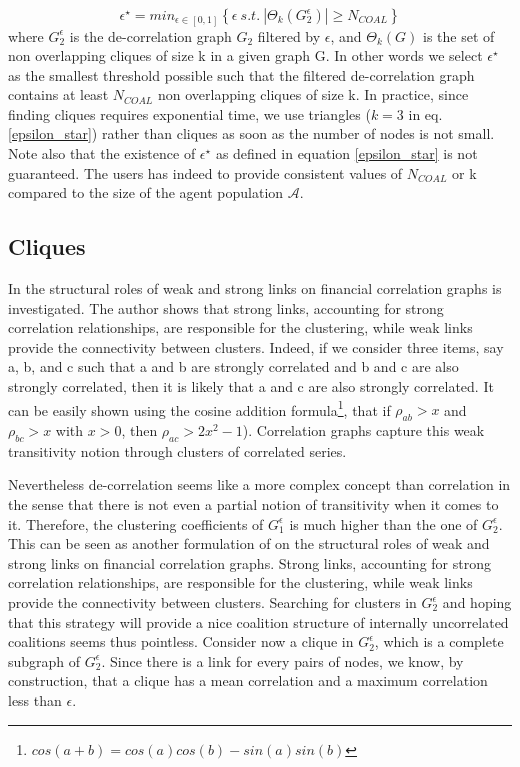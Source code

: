 \documentclass[journal]{IEEEtran}
\begin{document}
\begin{equation}
\label{epsilon_star}
\epsilon^{\star} = min_{ \epsilon \in [0,1]} \left\{ \epsilon\ s.t.\ |\Theta_{k}(G_{2}^{\epsilon})| \geq N_{COAL} \right\}
\end{equation} 
where $ G_{2}^{\epsilon} $ is the de-correlation graph $ G_{2} $ filtered by $ \epsilon $, and $ \Theta_{k}(G) $ is the set of non overlapping cliques of size k in a given graph G. In other words we select $ \epsilon^{\star} $ as the smallest threshold possible such that the filtered de-correlation graph contains at least $ N_{COAL} $ non overlapping cliques of size k. In practice, since finding cliques requires exponential time, we use triangles \cite{Schank2001} ($k=3$ in eq. \ref{epsilon_star}) rather than cliques as soon as the number of nodes is not small. Note also that the existence of $ \epsilon^{\star} $  as defined in equation  \ref{epsilon_star} is not guaranteed. The users has indeed to provide consistent values of $ N_{COAL} $ or k compared to the size of the agent population $ \mathcal{A} $. 

\subsection{Cliques}

In \cite{Garas2008} the structural roles of weak and strong links on financial correlation graphs is investigated. The author shows that strong links, accounting for strong correlation relationships, are responsible for the clustering, while weak links provide the connectivity between clusters. Indeed, if we consider three items, say a, b, and c such that a and b are strongly correlated and b and c are also strongly correlated, then it is likely that a and c are also strongly correlated. It can be easily shown using the cosine addition formula\footnote{ $ cos(a+b) = cos(a)cos(b) - sin(a)sin(b) $ }, that if $\rho_{ab} > x $ and $\rho_{bc} > x $ with $ x>0 $, then $\rho_{ac} > 2x^{2}-1$). Correlation graphs capture this weak transitivity notion through clusters of correlated series.

Nevertheless de-correlation seems like a more complex concept than correlation in the sense that there is not even a partial notion of transitivity when it comes to it. Therefore, the clustering coefficients of $ G_{1}^{\epsilon} $ is much higher than the one of $ G_{2}^{\epsilon} $. This can be seen as another formulation of \cite{Garas2008} on the structural roles of weak and strong links on financial correlation graphs. Strong links, accounting for strong correlation relationships, are responsible for the clustering, while weak links provide the connectivity between clusters. Searching for clusters in $ G_{2}^{\epsilon} $ and hoping that this strategy will provide a nice coalition structure of internally uncorrelated coalitions seems thus pointless. Consider now a clique in  $ G_{2}^{\epsilon} $, which is a complete subgraph of $ G_{2}^{\epsilon} $. Since there is a link for every pairs of nodes, we know, by construction, that a clique has a mean correlation and a maximum correlation less than $ \epsilon $. 
\end{document}
